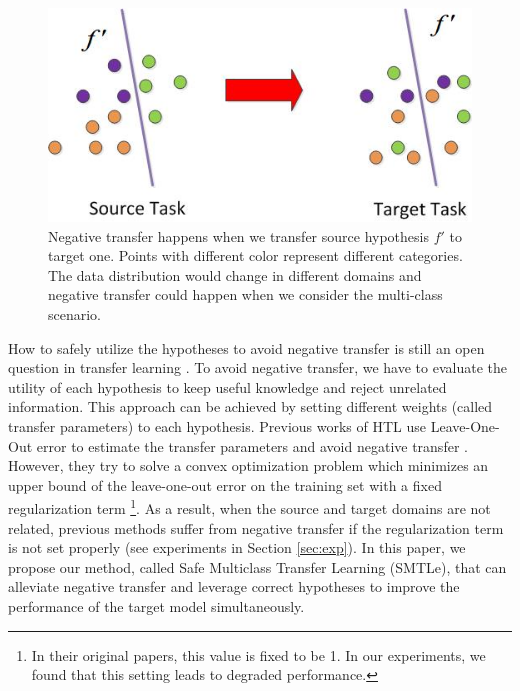 
\begin{figure}
	\centering
	\includegraphics[scale=.5]{fig/domain2.jpg}
	\caption{Negative transfer happens when we transfer source hypothesis $f'$ to target one. Points with different color represent different categories. The data distribution would change in different domains and negative transfer could happen when we consider the multi-class scenario. }\label{fig:distribution}
\end{figure}

How to safely utilize the hypotheses to avoid negative transfer is still an open question in transfer learning \cite{Lu201514}. To avoid negative transfer, we have to evaluate the utility of each hypothesis to keep useful knowledge and reject unrelated information. This approach can be achieved by setting different weights (called transfer parameters) to each hypothesis.
Previous works of HTL use Leave-One-Out error to estimate the transfer parameters and avoid negative transfer \cite{tommasi2014learning} \cite{kuzborskij2013n}. However, they try to solve a convex
optimization problem which minimizes an upper bound of
the leave-one-out error on the training set with a fixed regularization term \footnote{In their original papers, this value is fixed to be 1. In our experiments, we found that this setting leads to degraded performance.}. As a result, when the source and target domains are not related, previous methods suffer from negative transfer if the regularization term is not set properly (see experiments in Section \ref{sec:exp}).
In this paper, we propose our method, {called Safe Multiclass Transfer Learning (SMTLe)}, that can alleviate negative transfer and leverage correct hypotheses to improve the performance of the target model simultaneously. 

